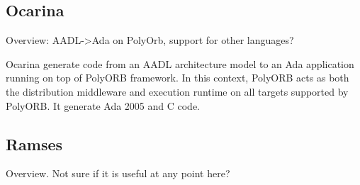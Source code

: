 \subsection{Ocarina}
\label{background:codegen:ocarina}
Overview: AADL->Ada on PolyOrb, support for other languages?

Ocarina generate code from an AADL architecture model to an Ada application running on top of PolyORB framework. In this context, PolyORB acts as both the distribution middleware and execution runtime on all targets supported by PolyORB.
It generate Ada 2005 and C code.


\subsection{Ramses}
\label{background:codegen:ramses}
Overview. Not sure if it is useful at any point here?